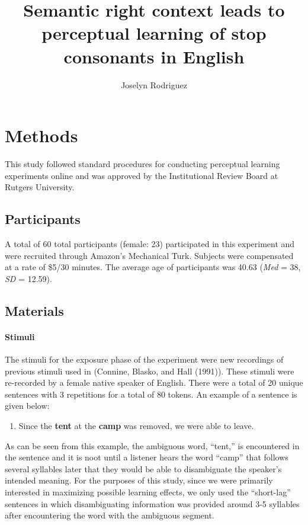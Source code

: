 \documentclass[
  english,
  man]{apa6}
\title{Semantic right context leads to perceptual learning of stop consonants in English}
\author{Joselyn Rodriguez\textsuperscript{}}
\date{}
\affiliation{\phantom{0}}
\providecommand{\tightlist}{%
  \setlength{\itemsep}{0pt}\setlength{\parskip}{0pt}}
\let\oldparagraph\paragraph
\renewcommand{\paragraph}[1]{\oldparagraph{#1}\mbox{}}
\begin{document}
\maketitle

\hypertarget{methods}{%
\section{Methods}\label{methods}}

This study followed standard procedures for conducting perceptual learning experiments online and was approved by the Institutional Review Board at Rutgers University.

\hypertarget{participants}{%
\subsection{Participants}\label{participants}}

A total of 60 total participants (female: 23) participated in this experiment and were recruited through Amazon's Mechanical Turk. Subjects were compensated at a rate of \$5/30 minutes. The average age of participants was 40.63 (\emph{Med} = 38, \emph{SD} = 12.59).

\hypertarget{materials}{%
\subsection{Materials}\label{materials}}

\hypertarget{stimuli}{%
\paragraph{Stimuli}\label{stimuli}}

The stimuli for the exposure phase of the experiment were new recordings of previous stimuli used in (Connine, Blasko, and Hall (1991)). These stimuli were re-recorded by a female native speaker of English. There were a total of 20 unique sentences with 3 repetitions for a total of 80 tokens. An example of a sentence is given below:

\begin{enumerate}
\def\labelenumi{(\arabic{enumi})}
\tightlist
\item
  Since the \textbf{tent} at the \textbf{camp} was removed, we were able to leave.
\end{enumerate}

As can be seen from this example, the ambiguous word, ``tent,'' is encountered in the sentence and it is noot until a listener hears the word ``camp'' that follows several syllables later that they would be able to disambiguate the speaker's intended meaning. For the purposes of this study, since we were primarily interested in maximizing possible learning effects, we only used the ``short-lag'' sentences in which disambiguating information was provided around 3-5 syllables after encountering the word with the ambiguous segment.
\end{document}

